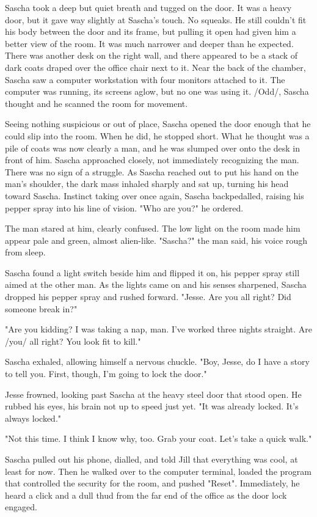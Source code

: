 Sascha took a deep but quiet breath and tugged on the door.  It was a heavy door, but it gave way slightly at Sascha's touch.  No squeaks.  He still couldn't fit his body between the door and its frame, but pulling it open had given him a better view of the room.  It was much narrower and deeper than he expected.  There was another desk on the right wall, and there appeared to be a stack of dark coats draped over the office chair next to it.  Near the back of the chamber, Sascha saw a computer workstation with four monitors attached to it.  The computer was running, its screens aglow, but no one was using it.  /Odd/, Sascha thought and he scanned the room for movement.

Seeing nothing suspicious or out of place, Sascha opened the door enough that he could slip into the room.  When he did, he stopped short.  What he thought was a pile of coats was now clearly a man, and he was slumped over onto the desk in front of him.  Sascha approached closely, not immediately recognizing the man.  There was no sign of a struggle.  As Sascha reached out to put his hand on the man's shoulder, the dark mass inhaled sharply and sat up, turning his head toward Sascha.  Instinct taking over once again, Sascha backpedalled, raising his pepper spray into his line of vision.  "Who are you?" he ordered.

The man stared at him, clearly confused.  The low light on the room made him appear pale and green, almost alien-like.  "Sascha?" the man said, his voice rough from sleep.

Sascha found a light switch beside him and flipped it on, his pepper spray still aimed at the other man.  As the lights came on and his senses sharpened, Sascha dropped his pepper spray and rushed forward.  "Jesse.  Are you all right?  Did someone break in?"

"Are you kidding?  I was taking a nap, man.  I've worked three nights straight.  Are /you/ all right?  You look fit to kill."

Sascha exhaled, allowing himself a nervous chuckle.  "Boy, Jesse, do I have a story to tell you.  First, though, I'm going to lock the door."

Jesse frowned, looking past Sascha at the heavy steel door that stood open.  He rubbed his eyes, his brain not up to speed just yet.  "It was already locked.  It's always locked."

"Not this time.  I think I know why, too.  Grab your coat.  Let's take a quick walk."

Sascha pulled out his phone, dialled, and told Jill that everything was cool, at least for now.  Then he walked over to the computer terminal, loaded the program that controlled the security for the room, and pushed "Reset".  Immediately, he heard a click and a dull thud from the far end of the office as the door lock engaged.


